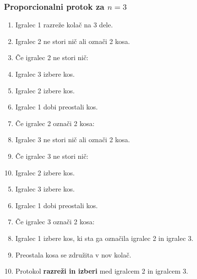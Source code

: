 \documentclass{beamer}
\begin{document}
	\begin{frame}
		\frametitle{Proporcionalni protok za $n = 3$}
		\begin{enumerate}
			\item Igralec 1 razreže kolač na 3 dele.
			
			\item Igralec 2 ne stori nič ali označi 2 kosa.
			
			\item[] Če igralec 2 ne stori nič:
			
			\setcounter{enumi}{2}
			
			\item \qquad Igralec 3 izbere kos.
			
			\item \qquad Igralec 2 izbere kos.
			
			\item \qquad Igralec 1 dobi preostali kos.
			
			\item[] Če igralec 2 označi 2 kosa:
			
			\setcounter{enumi}{2}
			
			\item \qquad Igralec 3 ne stori nič ali označi 2 kosa.
			
			\item[] \qquad Če igralec 3 ne stori nič:
			
			\setcounter{enumi}{3}
			
			\item \qquad \qquad Igralec 2 izbere kos.
		\end{enumerate}
	\end{frame}
	
	\begin{frame}
		\begin{enumerate}			
			\setcounter{enumi}{4}
			
			\item \qquad \qquad Igralec 3 izbere kos.
			
			\item \qquad \qquad Igralec 1 dobi preostali kos.
			
			\item[] \qquad Če igralec 3 označi 2 kosa:
			
			\setcounter{enumi}{3}
			
			\item \qquad \qquad Igralec 1 izbere kos, ki sta ga označila igralec 2 in igralec 3.
			
			\item \qquad \qquad Preostala kosa se združita v nov kolač.
			
			\item \qquad \qquad Protokol \textbf{razreži in izberi} med igralcem 2 in igralcem 3.
		\end{enumerate}
	\end{frame}
\end{document}
